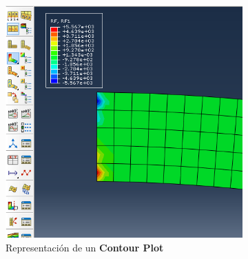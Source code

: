 \begin{enumerate}
 \begin{figure}[H]
   \centering
   \begin{subfigure}{0.30\textwidth}
     \includegraphics[width=\textwidth]{./body/images/imagen98}
     \caption{Representación de un \textbf{Contour Plot}}
     \label{figu98}
   \end{subfigure}%
   ~ %
   \begin{subfigure}{0.30\textwidth}

\end{subfigure}
\end{figure}
\end{enumerate}
